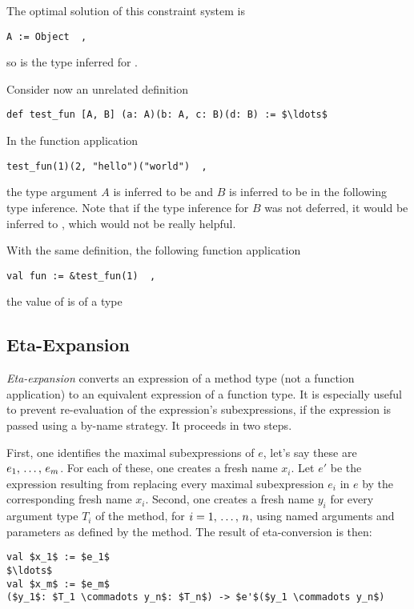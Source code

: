 The optimal solution of this constraint system is
\begin{lstlisting}
A := Object  ,
\end{lstlisting}
so  is the type inferred for . 

\example Consider now an unrelated definition
\begin{lstlisting}
def test_fun [A, B] (a: A)(b: A, c: B)(d: B) := $\ldots$
\end{lstlisting}

In the function application
\begin{lstlisting}
test_fun(1)(2, "hello")("world")  ,
\end{lstlisting}
the type argument $A$ is inferred to be  and $B$ is inferred to be  in the following type inference. Note that if the type inference for $B$ was not deferred, it would be inferred to , which would not be really helpful. 

With the same definition, the following function application
\begin{lstlisting}
val fun := &test_fun(1)  ,
\end{lstlisting}
the value of  is of a type 





\subsection{Eta-Expansion}
\label{sec:eta-expansion}

{\em Eta-expansion} converts an expression of a method type (not a function application) to an equivalent expression of a function type. It is especially useful to prevent re-evaluation of the expression's subexpressions, if the expression is passed using a by-name strategy. It proceeds in two steps. 

First, one identifies the maximal subexpressions of $e$, let's say these are $e_1 ,\, \ldots ,\, e_m$. For each of these, one creates a fresh name $x_i$. Let $e'$ be the expression resulting from replacing every maximal subexpression $e_i$ in $e$ by the corresponding fresh name $x_i$. Second, one creates a fresh name $y_i$ for every argument type $T_i$ of the method, for $i = 1 ,\, \ldots ,\, n$, using named arguments and parameters as defined by the method. The result of eta-conversion is then: 
\begin{lstlisting}
val $x_1$ := $e_1$
$\ldots$
val $x_m$ := $e_m$
($y_1$: $T_1 \commadots y_n$: $T_n$) -> $e'$($y_1 \commadots y_n$)
\end{lstlisting}







